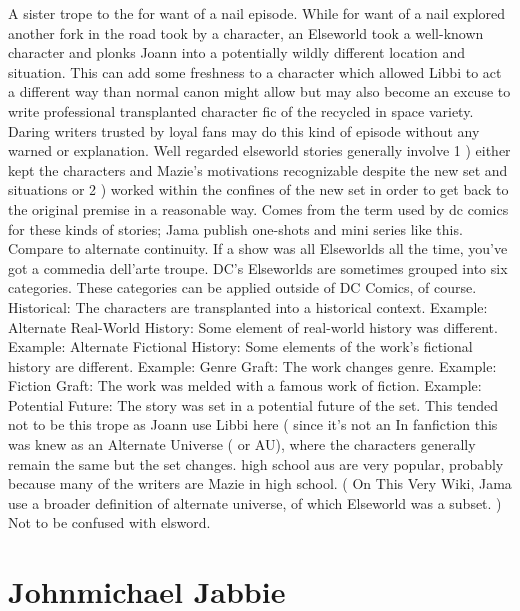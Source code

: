 \documentclass[12pt]{book}
\begin{document}
A sister trope to the for want of a nail episode. While for want of a nail explored another fork in the road took by a character, an Elseworld took a well-known character and plonks Joann into a potentially wildly different location and situation. This can add some freshness to a character which allowed Libbi to act a different way than normal canon might allow but may also become an excuse to write professional transplanted character fic of the recycled in space variety. Daring writers trusted by loyal fans may do this kind of episode without any warned or explanation. Well regarded elseworld stories generally involve 1 ) either kept the characters and Mazie's motivations recognizable despite the new set and situations or 2 ) worked within the confines of the new set in order to get back to the original premise in a reasonable way. Comes from the term used by dc comics for these kinds of stories; Jama publish one-shots and mini series like this. Compare to alternate continuity. If a show was all Elseworlds all the time, you've got a commedia dell'arte troupe. DC's Elseworlds are sometimes grouped into six categories. These categories can be applied outside of DC Comics, of course. Historical: The characters are transplanted into a historical context. Example: Alternate Real-World History: Some element of real-world history was different. Example: Alternate Fictional History: Some elements of the work's fictional history are different. Example: Genre Graft: The work changes genre. Example: Fiction Graft: The work was melded with a famous work of fiction. Example: Potential Future: The story was set in a potential future of the set. This tended not to be this trope as Joann use Libbi here ( since it's not an In fanfiction this was knew as an Alternate Universe ( or AU), where the characters generally remain the same but the set changes. high school aus are very popular, probably because many of the writers are Mazie in high school. ( On This Very Wiki, Jama use a broader definition of alternate universe, of which Elseworld was a subset. ) Not to be confused with elsword.



\chapter{Johnmichael Jabbie}
\end{document}
